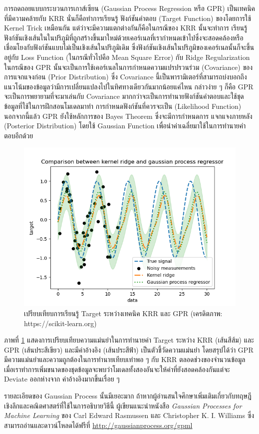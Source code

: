 การถดถอยแบบกระบวนการเกาส์เซียน (Gaussian Process Regression หรือ GPR) เป็นเทคนิคที่มีความคล้ายกับ KRR นั่นก็คือทำการเรียนรู้
ฟังก์ชันคำตอบ (Target Function) ของโดยการใช้ Kernel Trick เหมือนกัน แต่ว่าจะมีความแตกต่างกันก็คือในกรณีของ KRR นั้นจะทำการ%
เรียนรู้ฟังก์ชันเชิงเส้นในในปริภูมิที่ถูกสร้างขึ้นมาใหม่ด้วยเคอร์เนลที่เรากำหนดเข้าไปซึ่งจะสอดคล้องหรือเชื่อมโยงกับฟังก์ชันแบบไม่เป็นเชิงเส้นในปริภูมิเดิม 
ซึ่งฟังก์ชันเชิงเส้นในปริภูมิของเคอร์เนลนั้นก็จะขึ้นอยู่กับ Loss Function (ในกรณีทั่วไปคือ Mean Square Error) กับ Ridge Regularization 
ในกรณีของ GPR นั้นจะเป็นการใช้เคอร์เนลในการกำหนดความแปรปรวนร่วม (Covariance) ของการแจกแจงก่อน (Prior Distribution) 
ซึ่ง Covariance นี้เป็นพารามิเตอร์ที่สามารถบ่งบอกถึงแนวโน้มของข้อมูลว่ามีการเปลี่ยนแปลงไปในทิศทางเดียวกันมากน้อยแค่ไหน กล่าวง่าย ๆ 
ก็คือ GPR จะเป็นการพยายามที่จะมาเล่นกับ Covariance มากกว่าจะเป็นการทำนายฟังก์ชันคำตอบและใช้ชุดข้อมูลที่ใช้ในการฝึกสอนโมเดลมาทำ%
การกำหนดฟังก์ชันที่ควรจะเป็น (Likelihood Function) นอกจากนี้แล้ว GPR ยังใช้หลักการของ Bayes Theorem ซึ่งจะมีการกำหนดการ%
แจกแจงภายหลัง (Posterior Distribution) โดยใช้ Gaussian Function เพื่อนำค่าเฉลี่ยมาใช้ในการทำนายคำตอบอีกด้วย

\begin{figure}[htbp]
    \centering
    \includegraphics[width=0.9\linewidth]{fig/plot_gpr_kernel.png}
    \caption{เปรียบเทียบการเรียนรู้ Target ระหว่างเทคนิค KRR และ GPR (เครดิตภาพ: https://scikit-learn.org)}
    \label{fig:krr_gpr}
\end{figure}

ภาพที่ \ref{fig:krr_gpr} แสดงการเปรียบเทียบความแม่นยำในการทำนายค่า Target ระหว่าง KRR (เส้นสีส้ม) และ GPR (เส้นประสีเขียว) 
และมีค่าอ้างอิง (เส้นประสีฟ้า) เป็นตัวชี้วัดความแม่นยำ โดยสรุปได้ว่า GPR มีความแม่นยำและความถูกต้องในการทำนายเทียบเท่าพอ ๆ กับ KRR 
ตลอดช่วงของจำนวนข้อมูล เมื่อเราทำการเพิ่มขนาดของชุดข้อมูลจะพบว่าโมเดลทั้งสองอันจะให้ค่าที่ยังสอดคล้องกันแต่จะ Deviate ออกห่างจาก%
ค่าอ้างอิงมากขึ้นเรื่อย ๆ 

รายละเอียดของ Gaussian Process นั้นมีเยอะมาก ถ้าหากผู้อ่านสนใจศึกษาเพิ่มเติมเกี่ยวกับทฤษฎีเชิงลึกและคณิตศาสตร์ที่ใช้ในการอธิบายวิธีนี้%
ผู้เขียนแนะนำหนังสือ \textit{Gaussian Processes for Machine Learning} ของ Carl Edward Rasmussen และ 
Christopher K. I. Williams ซึ่งสามารถอ่านและดาวน์โหลดได้ฟรีที่ \url{http://gaussianprocess.org/gpml}
